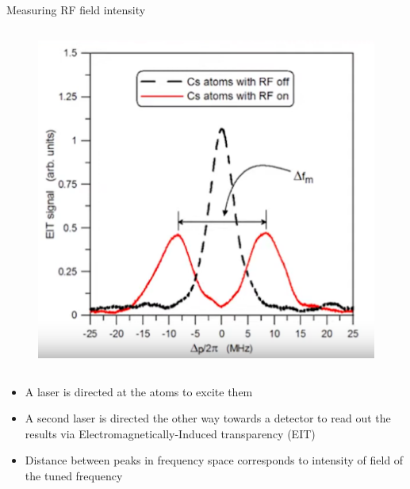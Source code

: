 \begin{columnframe}{Measuring RF field intensity}
    \begin{column}{0.5\textwidth}
        \begin{figure}
            \centering
            \includegraphics[width=\textwidth]{images/rydberg_eit.png}
        \end{figure}
    \end{column}
    \begin{column}{0.5\textwidth}
        \begin{itemize}
            \item A laser is directed at the atoms to excite them
            \item A second laser is directed the other way towards a detector to read out the results via
                  Electromagnetically-Induced transparency (EIT)
            \item Distance between peaks in frequency space corresponds to intensity of field of the tuned frequency
        \end{itemize}
    \end{column}
\end{columnframe}

